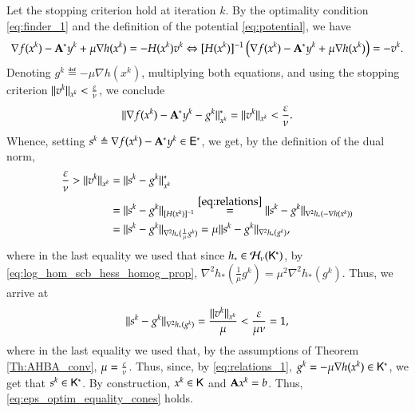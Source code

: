 Let the stopping criterion hold at iteration $k$. By the optimality condition \eqref{eq:finder_1} and the definition of the potential \eqref{eq:potential}, we have
\begin{equation}
\label{eq:FO_KKT_proof_0}
\nabla f(x^{k})-{\mathbf A}^{\ast}y^{k}+\mu \nabla h(x^{k}) =-H(x^{k})v^{k}\Leftrightarrow [H(x^{k})]^{-1}\left(\nabla f(x^{k})-{\mathbf A}^{\ast}y^{k}+\mu \nabla h(x^{k}) \right)=-v^{k}.
\end{equation}
Denoting $g^{k}\eqdef-\mu\nabla h(x^{k})$, multiplying both equations, and using the stopping criterion $\lVert v^{k}\rVert_{x^{k}} < \frac{\varepsilon}{\nu}$, we conclude 
\begin{equation}
\label{eq:FO_KKT_proof_00}
\lVert\nabla f(x^{k})-{\mathbf A}^{\ast}y^{k}-g^{k}\rVert^{\ast}_{x^{k}}=\lVert v^{k}\rVert_{x^{k}}<\frac{\varepsilon}{\nu}.
\end{equation}
Whence, setting $s^{k}\triangleq\nabla f(x^{k})-{\mathbf A}^{\ast}y^{k}\in\mathsf{E}^{\ast}$, we get, by the definition of the dual norm, 
\begin{align}
\frac{\varepsilon}{\nu} > \lVert v^{k}\rVert_{x^{k}}&=\lVert s^{k}-g^{k}\rVert^{\ast}_{x^{k}} \label{eq:FO_KKT_proof_1}\\
&=\lVert s^{k}-g^{k}\rVert_{[H(x^{k})]^{-1}}\stackrel{\eqref{eq:relations}}{=}\lVert s^{k}-g^{k}\rVert_{\nabla^{2}h_{\ast}(-\nabla h(x^{k}))} \\
&=\lVert s^{k}-g^{k}\rVert_{\nabla^{2}h_{\ast}(\frac{1}{\mu}g^{k})} = \mu\lVert s^{k}-g^{k}\rVert_{\nabla^{2}h_{\ast}(g^{k})}, \notag
\end{align}
where in the last equality we used that since $h_{\ast}\in\mathcal{H}_{\nu}(\mathsf{K}^{\ast})$, by \eqref{eq:log_hom_scb_hess_homog_prop}, 
$\nabla^{2}h_{\ast}(\frac{1}{\mu}g^{k})=\mu^{2}\nabla^{2}h_{\ast}(g^{k})$.
Thus, we arrive at
\begin{align}
\lVert s^{k}-g^{k}\rVert_{\nabla^{2}h_{\ast}(g^{k})} = \frac{\lVert v^{k}\rVert_{x^{k}}}{\mu} < \frac{\varepsilon}{\mu \nu} = 1, \label{eq:FO_KKT_proof_2}
\end{align}
where in the last equality we used that, by the assumptions of Theorem \ref{Th:AHBA_conv}, $\mu=\frac{\varepsilon}{\nu}$.
Thus, since, by \eqref{eq:relations_1}, $g^{k}=-\mu\nabla h(x^{k})\in \mathsf{K}^{\ast}$, we get that $s^{k}\in\mathsf{K}^{\ast}$. By construction, $x^{k}\in \mathsf{K}$ and ${\mathbf A} x^{k} = b$. Thus, \eqref{eq:eps_optim_equality_cones} holds.
